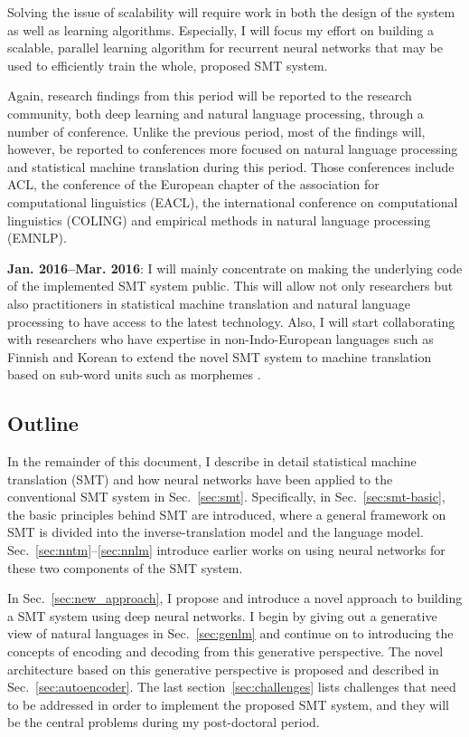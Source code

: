 \documentclass[11pt, oneside]{essay}
\begin{document}
Solving the issue of scalability will require work in both the
design of the system as well as learning algorithms. Especially,
I will focus my effort on building a scalable, parallel learning
algorithm for recurrent neural networks that may be used to
efficiently train the whole, proposed SMT system. 

Again, research findings from this period will be reported to the
research community, both deep learning and natural language
processing, through a number of conference. Unlike the previous
period, most of the findings will, however, be reported to
conferences more focused on natural language processing and
statistical machine translation during this period. Those
conferences include ACL, the conference of the European chapter
of the association for computational linguistics (EACL), the
international conference on computational linguistics (COLING)
and empirical methods in natural language processing (EMNLP). 

\textbf{Jan. 2016--Mar. 2016}: I will mainly concentrate on
making the underlying code of the implemented SMT system public.
This will allow not only researchers but also practitioners in
statistical machine translation and natural language processing
to have access to the latest technology. Also, I will start
collaborating with researchers who have expertise in
non-Indo-European languages such as Finnish and Korean to extend
the novel SMT system to machine translation based on sub-word
units such as morphemes \citep[see, e.g.,][]{Creutz2007}.

\subsection{Outline}

In the remainder of this document, I describe in detail
statistical machine translation (SMT) and how neural networks
have been applied to the conventional SMT system in
Sec.~\ref{sec:smt}. Specifically, in Sec.~\ref{sec:smt-basic},
the basic principles behind SMT are introduced, where a
general framework on SMT is divided into the
inverse-translation model and the language model. 
Sec.~\ref{sec:nntm}--\ref{sec:nnlm} introduce earlier works on
using neural networks for these two components of the SMT system. 

In Sec.~\ref{sec:new_approach}, I propose and introduce a novel
approach to building a SMT system using deep neural networks.  I
begin by giving out a generative view of natural languages in
Sec.~\ref{sec:genlm} and continue on to introducing the concepts
of encoding and decoding from this generative perspective. The
novel architecture based on this generative perspective is
proposed and described in Sec.~\ref{sec:autoencoder}. The last
section~\ref{sec:challenges} lists challenges that need to be
addressed in order to implement the proposed SMT system, and they
will be the central problems during my post-doctoral period.
\end{document}
